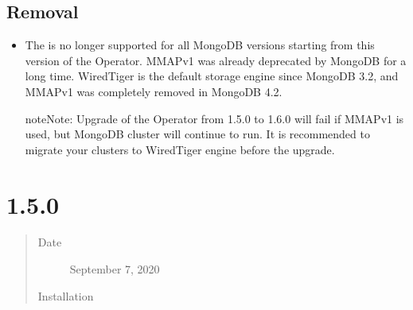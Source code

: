 \documentclass[letterpaper,10pt,english]{sphinxmanual}
\begin{document}
\subsection{Removal}
\label{\detokenize{RN/Kubernetes-Operator-for-PSMONGODB-RN1.6.0:removal}}\begin{itemize}
\item {} 
The 
is no longer supported for all MongoDB versions starting from this version of
the Operator. MMAPv1 was already deprecated by MongoDB for a long time.
WiredTiger is the default storage engine since MongoDB 3.2, and MMAPv1 was
completely removed in MongoDB 4.2.

\begin{sphinxadmonition}{note}{Note:}
Upgrade of the Operator from 1.5.0 to 1.6.0 will fail if MMAPv1 is
used, but MongoDB cluster will continue to run. It is recommended to
migrate your clusters to WiredTiger engine before the upgrade.
\end{sphinxadmonition}

\end{itemize}


\section{ 1.5.0}
\label{\detokenize{RN/Kubernetes-Operator-for-PSMONGODB-RN1.5.0:percona-kubernetes-operator-for-percona-server-for-mongodb-1-5-0}}\label{\detokenize{RN/Kubernetes-Operator-for-PSMONGODB-RN1.5.0:k8spsmdb-1-5-0}}\label{\detokenize{RN/Kubernetes-Operator-for-PSMONGODB-RN1.5.0::doc}}\begin{quote}\begin{description}
\item[{Date}] \leavevmode
September 7, 2020

\item[{Installation}] \leavevmode
{}

\end{description}\end{quote}
\end{document}
